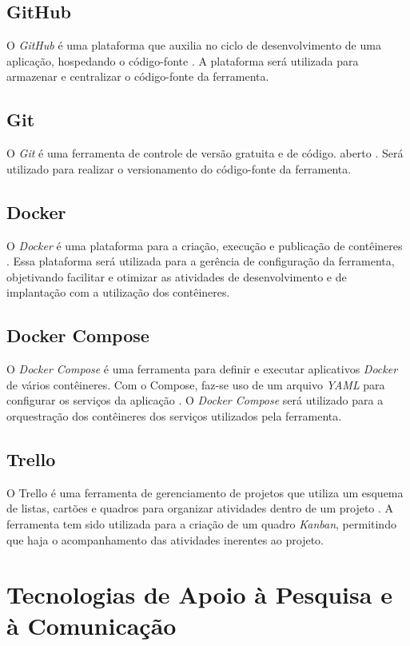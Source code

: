 \subsection{GitHub}
O \textit{GitHub} é uma plataforma que auxilia no ciclo de desenvolvimento de uma aplicação, hospedando o código-fonte \cite{github}. A plataforma será utilizada para armazenar e centralizar o código-fonte da ferramenta.

\subsection{Git}
O \textit{Git} é uma ferramenta de controle de versão gratuita e de código. aberto \cite{git}. Será utilizado para realizar o versionamento do código-fonte da ferramenta.

\subsection{Docker}
O \textit{Docker} é uma plataforma para a criação, execução e publicação de contêineres \cite{docker}. Essa plataforma será utilizada para a gerência de configuração da ferramenta, objetivando facilitar e otimizar as atividades de desenvolvimento e de implantação com a utilização dos contêineres.

\subsection{Docker Compose}
O \textit{Docker Compose} é uma ferramenta para definir e executar aplicativos \textit{Docker} de vários contêineres. Com o Compose, faz-se uso de um arquivo \textit{YAML} para configurar os serviços da aplicação \cite{docker-compose}. O \textit{Docker Compose} será utilizado para a orquestração dos contêineres dos serviços utilizados pela ferramenta.

\subsection{Trello}
O Trello é uma ferramenta de gerenciamento de projetos que utiliza um esquema de listas, cartões e quadros para organizar atividades dentro de um projeto \cite{trello}. A ferramenta tem sido utilizada para a criação de um quadro \textit{Kanban}, permitindo que haja o acompanhamento das atividades inerentes ao projeto.

\section{Tecnologias de Apoio à Pesquisa e à Comunicação}

